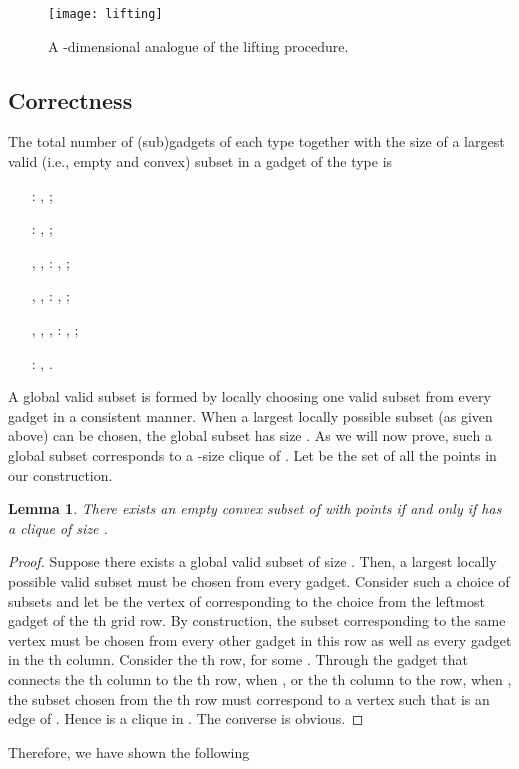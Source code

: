 \documentclass[11pt,a4paper]{article}
\newtheorem{lemma}[definition]{Lemma}
\begin{document}
\begin{figure}[h]
\centering
	\texttt{[image: lifting]}
	\caption{A -dimensional analogue of the lifting procedure.}
	\label{fig:lifting}
\end{figure}

\subsection{Correctness}
The total number of (sub)gadgets of each type together with the size of a largest valid (i.e., empty and convex) subset in a gadget of the type is
\begin{itemize}[leftmargin=2.2cm]
\setlength{\itemsep}{-\parsep}
\item[] : , ;
\item[] : , ;
\item[, , ] : , ;
\item[, , ] : , ;
\item[, , , ] : , ;
\item[] : , .
\end{itemize}

A global valid subset is formed by locally choosing one valid subset from every gadget in a consistent manner. When a largest locally possible subset (as given above) can be chosen, the global subset has size . As we will now prove, such a global subset corresponds to a -size clique of . Let  be the set of all the points in our construction.


\begin{lemma}
There exists an empty convex subset of  with  points if and only if  has a clique of size .
\end{lemma}
\begin{proof}
Suppose there exists a global valid subset of size . Then, a largest locally possible valid subset must be chosen from every gadget. Consider such a choice of subsets and let  be the vertex of  corresponding to the choice from the leftmost gadget of the th grid row. By construction, the subset corresponding to the same vertex  must be chosen from every other gadget in this row as well as every gadget in the th column. Consider the th row, for some . Through the  gadget that connects the th column to the th row, when , or the th column to the  row, when , the subset chosen from the th row must correspond to a vertex  such that  is an edge of . Hence  is a clique in . The converse is obvious.
\end{proof}

Therefore, we have shown the following
\end{document}
